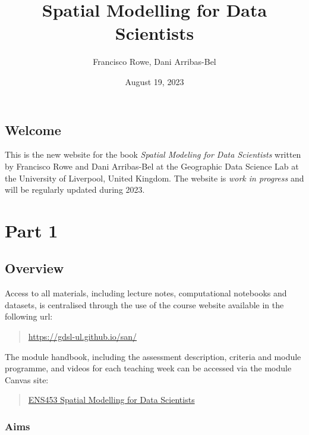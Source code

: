 \documentclass[
  letterpaper,
  krantz2]{style/krantz}
\title{Spatial Modelling for Data Scientists}
\author{Francisco Rowe, Dani Arribas-Bel}
\date{August 19, 2023}
\begin{document}
\maketitle
\ifdefined\Shaded\renewenvironment{Shaded}{\begin{tcolorbox}[boxrule=0pt, colback={shadecolor}, enhanced, frame hidden, breakable]}{\end{tcolorbox}}\fi


\hypertarget{welcome}{%
\chapter*{Welcome}\label{welcome}}


This is the new website for the book \emph{Spatial Modeling for Data
Scientists} written by Francisco Rowe and Dani Arribas-Bel at the
Geographic Data Science Lab at the University of Liverpool, United
Kingdom. The website is \emph{work in progress} and will be regularly
updated during 2023.

\part{Part 1}

\hypertarget{overview}{%
\chapter{Overview}\label{overview}}

Access to all materials, including lecture notes, computational
notebooks and datasets, is centralised through the use of the course
website available in the following url:

\begin{quote}
\url{https://gdsl-ul.github.io/san/}
\end{quote}

The module handbook, including the assessment description, criteria and
module programme, and videos for each teaching week can be accessed via
the module Canvas site:

\begin{quote}
\href{https://liverpool.instructure.com}{ENS453 Spatial Modelling for
Data Scientists}
\end{quote}

\hypertarget{aims}{%
\section{Aims}\label{aims}}
\end{document}
